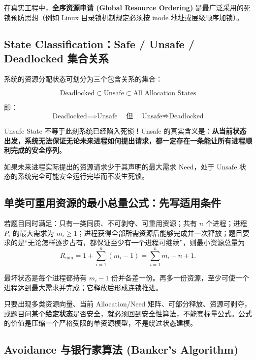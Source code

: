 \documentclass[11pt,a4paper]{ctexart}
\newcommand{\kw}[1]{\textbf{#1}}
\begin{document}
在真实工程中，\kw{全序资源申请 (Global Resource Ordering)} 是最广泛采用的死锁预防思想（例如 Linux 目录锁机制规定必须按 inode 地址或层级顺序加锁）。

\subsection{State Classification：Safe / Unsafe / Deadlocked 集合关系}

系统的资源分配状态可划分为三个包含关系的集合：

\[
\boxed{\text{Deadlocked} \subset \text{Unsafe} \subset \text{All Allocation States}}
\]

即：
\[
\boxed{\text{Deadlocked} \implies \text{Unsafe}} \quad \text{但} \quad \boxed{\text{Unsafe} \nRightarrow \text{Deadlocked}}
\]

\begin{corebox}
Unsafe State 不等于此刻系统已经陷入死锁！Unsafe 的真实含义是：\kw{从当前状态出发，系统无法保证无论未来进程如何提出请求，都一定存在一条能让所有进程顺利完成的安全序列}。

如果未来进程实际提出的资源请求少于其声明的最大需求 $\text{Need}$，处于 Unsafe 状态的系统完全可能安全运行完毕而不发生死锁。
\end{corebox}

\subsection{单类可重用资源的最小总量公式：先写适用条件}

若题目同时满足：只有一类同质、不可剥夺、可重用资源；共有 $n$ 个进程；进程 $P_i$ 的最大需求为 $m_i\ge 1$；进程获得全部所需资源后能够完成并一次释放；题目要求的是“无论怎样逐步占有，都保证至少有一个进程可继续”，则最小资源总量为
\[
\boxed{R_{\min}=1+\sum_{i=1}^{n}(m_i-1)=\sum_{i=1}^{n}m_i-n+1.}
\]

最坏状态是每个进程都持有 $m_i-1$ 份并各差一份。再多一份资源，至少可使一个进程达到最大需求并完成；它释放后形成连锁推进。

\begin{warn}
只要出现多类资源向量、当前 Allocation/Need 矩阵、可部分释放、资源可剥夺，或题目问某个\kw{给定状态}是否安全，就必须回到安全性算法，不能套标量公式。公式的价值是压缩一个严格受限的单资源模型，不是绕过状态建模。
\end{warn}

\subsection{Avoidance 与银行家算法 (Banker's Algorithm)}
\end{document}
